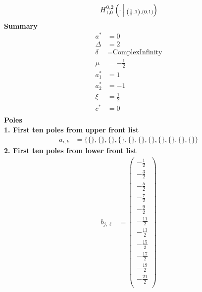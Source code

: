 \documentclass{article}
\newcommand{\FoxH}[5]{H_{#2}^{#1}\left(#3\:\middle\vert\: \begin{subarray}{l}#4\\[0.4em] #5\end{subarray}\right)}
\begin{document}
\begin{align*}
\FoxH{0,2}{1,0}{\cdot}{}{\left(\frac{1}{2}, 1\right), \left(0, 1\right)}
\end{align*}
\noindent\textbf{Summary}
\begin{align*}
a^* &= 0 \\
\Delta &= 2 \\
\delta &= \text{ComplexInfinity} \\
\mu &= -\frac{1}{2} \\
a_1^* &= 1 \\
a_2^* &= -1 \\
\xi &= \frac{1}{2} \\
c^* &= 0 \\
\end{align*}
\noindent\textbf{Poles}\\
\noindent\textbf{1. First ten poles from upper front list}
\begin{align*}
a_{i,k} &= \{\{\},\{\},\{\},\{\},\{\},\{\},\{\},\{\},\{\},\{\},\{\}\}
\end{align*}
\noindent\textbf{2. First ten poles from lower front list}
\begin{align*}
b_{j,\ell} &= \left(
\begin{array}{c}
 -\frac{1}{2} \\
 -\frac{3}{2} \\
 -\frac{5}{2} \\
 -\frac{7}{2} \\
 -\frac{9}{2} \\
 -\frac{11}{2} \\
 -\frac{13}{2} \\
 -\frac{15}{2} \\
 -\frac{17}{2} \\
 -\frac{19}{2} \\
 -\frac{21}{2} \\
\end{array}
\right)
\end{align*}
\end{document}
